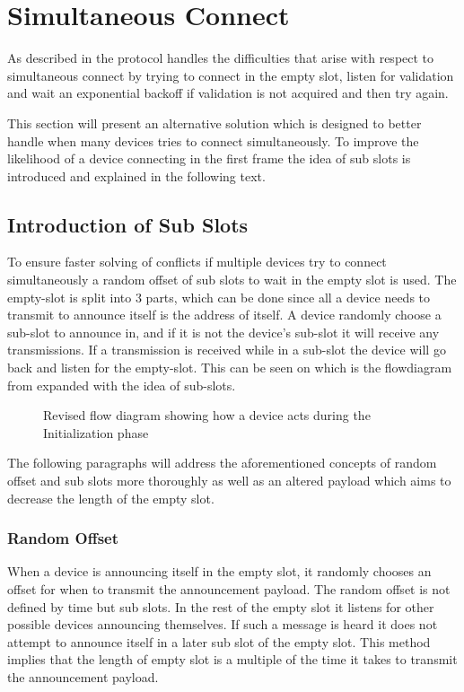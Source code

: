 \section{Simultaneous Connect}
As described in  the protocol handles the difficulties that arise with respect to simultaneous connect by trying to connect in the empty slot, listen for validation and wait an exponential backoff if validation is not acquired and then try again.

This section will present an alternative solution which is designed to better handle when many devices tries to connect simultaneously.
To improve the likelihood of a device connecting in the first frame the idea of sub slots is introduced and explained in the following text.

\subsection{Introduction of Sub Slots} %
\label{sub:introduction_of_sub_slots}
To ensure faster solving of conflicts if multiple devices try to connect simultaneously a random offset of sub slots to wait in the empty slot is used.
The empty-slot is split into 3 parts, which can be done since all a device needs to transmit to announce itself is the address of itself.
A device randomly choose a sub-slot to announce in, and if it is not the device's sub-slot it will receive any transmissions. 
If a transmission is received while in a sub-slot the device will go back and listen for the empty-slot.
This can be seen on  which is the flowdiagram from  expanded with the idea of sub-slots.

\begin{figure}[p]
    \centering \footnotesize
    
    \caption{Revised flow diagram showing how a device acts during the Initialization phase}
    \label{fig:pseudo_flowMultiConnectimp}
\end{figure}

The following paragraphs will address the aforementioned concepts of random offset and sub slots more thoroughly as well as an altered payload which aims to decrease the length of the empty slot.

\subsubsection{Random Offset}\label{roff}
When a device is announcing itself in the empty slot, it randomly chooses an offset for when to transmit the announcement payload.
The random offset is not defined by time but sub slots. 
In the rest of the empty slot it listens for other possible devices announcing themselves.
If such a message is heard it does not attempt to announce itself in a later sub slot of the empty slot.
This method implies that the length of empty slot is a multiple of the time it takes to transmit the announcement payload.

